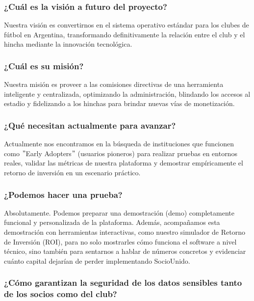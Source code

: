 \subsubsection{¿Cuál es la visión a futuro del proyecto?}

Nuestra visión es convertirnos en el sistema operativo estándar para los clubes de fútbol en Argentina, transformando definitivamente la relación entre el club y el hincha mediante la innovación tecnológica.

\subsubsection{¿Cuál es su misión?}

Nuestra misión es proveer a las comisiones directivas de una herramienta inteligente y centralizada, optimizando la administración, blindando los accesos al estadio y fidelizando a los hinchas para brindar nuevas vías de monetización.

\subsubsection{¿Qué necesitan actualmente para avanzar?}

Actualmente nos encontramos en la búsqueda de instituciones que funcionen como $"$Early Adopters$"$ (usuarios pioneros) para realizar pruebas en entornos reales, validar las métricas de nuestra plataforma y demostrar empíricamente el retorno de inversión en un escenario práctico.

\subsubsection{¿Podemos hacer una prueba?}

Absolutamente. Podemos preparar una demostración (demo) completamente funcional y personalizada de la plataforma. Además, acompañamos esta demostración con herramientas interactivas, como nuestro simulador de Retorno de Inversión (ROI), para no solo mostrarles cómo funciona el software a nivel técnico, sino también para sentarnos a hablar de números concretos y evidenciar cuánto capital dejarían de perder implementando SocioUnido.

\subsubsection{¿Cómo garantizan la seguridad de los datos sensibles tanto de los socios como del club?}

